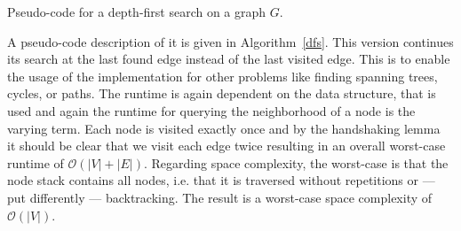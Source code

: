                \begin{algorithm}[htp]
                    \hrulealg
                \caption{Pseudo-code for a depth-first search on a graph $G$.}\label{dfs}
                \end{algorithm}
                A pseudo-code description of it is given in Algorithm~\ref{dfs}. 
                This version continues its search at the last found edge instead of the last visited edge. 
                This is to enable the usage of the implementation for other problems like finding spanning trees, cycles, or paths.
                The runtime is again dependent on the data structure, that is used and again the runtime for querying the neighborhood of a node is the varying term. 
                Each node is visited exactly once and by the handshaking lemma~\autocite{Gross1998GraphTA} it should be clear that we visit each edge twice resulting in an overall worst-case runtime of $\mathcal{O}(|V|+|E|)$. 
                Regarding space complexity, the worst-case is that the node stack contains all nodes, i.e. that it is traversed without repetitions or --- put differently --- backtracking. 
                The result is a worst-case space complexity of $\mathcal{O}(|V|)$.
            
